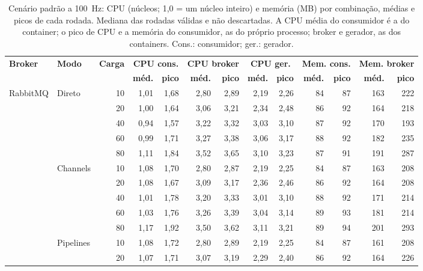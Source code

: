 \begin{table}[p]
\centering
\caption{Cenário padrão a 100~Hz: CPU (núcleos; 1,0 = um núcleo inteiro) e memória (MB)
por combinação, médias e picos de cada rodada. Mediana das rodadas válidas e não
descartadas. A CPU média do consumidor é a do container; o pico de CPU e a memória do
consumidor, as do próprio processo; broker e gerador, as dos containers. Cons.:
consumidor; ger.: gerador.}
\label{tab:metricas-recursos}
\scriptsize
\setlength{\tabcolsep}{4pt}
\begin{tabular}{|l|l|r|r|r|r|r|r|r|r|r|r|r|}
\hline
\multirow{2}{*}{\textbf{Broker}} & \multirow{2}{*}{\textbf{Modo}} & \multirow{2}{*}{\textbf{Carga}} & \multicolumn{2}{c|}{\textbf{CPU cons.}} & \multicolumn{2}{c|}{\textbf{CPU broker}} & \multicolumn{2}{c|}{\textbf{CPU ger.}} & \multicolumn{2}{c|}{\textbf{Mem. cons.}} & \multicolumn{2}{c|}{\textbf{Mem. broker}} \\
\cline{4-13}
 & & & \textbf{méd.} & \textbf{pico} & \textbf{méd.} & \textbf{pico} & \textbf{méd.} & \textbf{pico} & \textbf{méd.} & \textbf{pico} & \textbf{méd.} & \textbf{pico} \\
\hline
\multirow{15}{*}{RabbitMQ} & \multirow{5}{*}{Direto} & 10 & 1,01 & 1,68 & 2,80 & 2,89 & 2,19 & 2,26 & 84 & 87 & 163 & 222 \\
 &  & 20 & 1,00 & 1,64 & 3,06 & 3,21 & 2,34 & 2,48 & 86 & 92 & 164 & 218 \\
 &  & 40 & 0,94 & 1,57 & 3,22 & 3,32 & 3,03 & 3,10 & 87 & 92 & 170 & 193 \\
 &  & 60 & 0,99 & 1,71 & 3,27 & 3,38 & 3,06 & 3,17 & 88 & 92 & 182 & 235 \\
 &  & 80 & 1,11 & 1,84 & 3,52 & 3,65 & 3,10 & 3,23 & 87 & 91 & 191 & 287 \\
\cline{2-13}
 & \multirow{5}{*}{Channels} & 10 & 1,08 & 1,70 & 2,80 & 2,87 & 2,19 & 2,25 & 84 & 87 & 163 & 208 \\
 &  & 20 & 1,08 & 1,67 & 3,09 & 3,17 & 2,36 & 2,46 & 86 & 92 & 164 & 208 \\
 &  & 40 & 1,01 & 1,78 & 3,20 & 3,33 & 3,01 & 3,10 & 88 & 92 & 171 & 214 \\
 &  & 60 & 1,03 & 1,76 & 3,26 & 3,39 & 3,04 & 3,14 & 89 & 93 & 181 & 214 \\
 &  & 80 & 1,17 & 1,92 & 3,50 & 3,62 & 3,11 & 3,21 & 89 & 94 & 201 & 293 \\
\cline{2-13}
 & \multirow{5}{*}{Pipelines} & 10 & 1,08 & 1,72 & 2,80 & 2,89 & 2,19 & 2,25 & 84 & 87 & 161 & 208 \\
 &  & 20 & 1,07 & 1,71 & 3,07 & 3,19 & 2,29 & 2,40 & 86 & 92 & 164 & 226 \\

\end{tabular}
\end{table}
